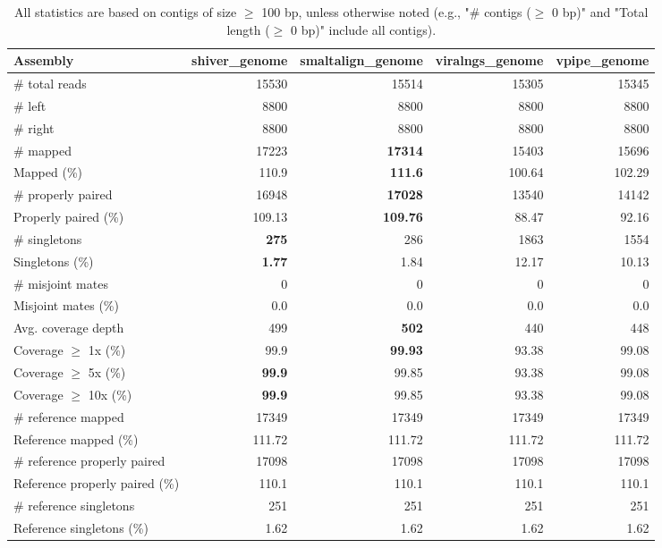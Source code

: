 \documentclass[12pt,a4paper]{article}
\begin{document}
\begin{table}[ht]
\begin{center}
\caption{All statistics are based on contigs of size $\geq$ 100 bp, unless otherwise noted (e.g., "\# contigs ($\geq$ 0 bp)" and "Total length ($\geq$ 0 bp)" include all contigs).}
\begin{tabular}{|l*{4}{|r}|}
\hline
Assembly & shiver\_genome & smaltalign\_genome & viralngs\_genome & vpipe\_genome \\ \hline
\# total reads & 15530 & 15514 & 15305 & 15345 \\ \hline
\# left & 8800 & 8800 & 8800 & 8800 \\ \hline
\# right & 8800 & 8800 & 8800 & 8800 \\ \hline
\# mapped & 17223 & {\bf 17314} & 15403 & 15696 \\ \hline
Mapped (\%) & 110.9 & {\bf 111.6} & 100.64 & 102.29 \\ \hline
\# properly paired & 16948 & {\bf 17028} & 13540 & 14142 \\ \hline
Properly paired (\%) & 109.13 & {\bf 109.76} & 88.47 & 92.16 \\ \hline
\# singletons & {\bf 275} & 286 & 1863 & 1554 \\ \hline
Singletons (\%) & {\bf 1.77} & 1.84 & 12.17 & 10.13 \\ \hline
\# misjoint mates & 0 & 0 & 0 & 0 \\ \hline
Misjoint mates (\%) & 0.0 & 0.0 & 0.0 & 0.0 \\ \hline
Avg. coverage depth & 499 & {\bf 502} & 440 & 448 \\ \hline
Coverage $\geq$ 1x (\%) & 99.9 & {\bf 99.93} & 93.38 & 99.08 \\ \hline
Coverage $\geq$ 5x (\%) & {\bf 99.9} & 99.85 & 93.38 & 99.08 \\ \hline
Coverage $\geq$ 10x (\%) & {\bf 99.9} & 99.85 & 93.38 & 99.08 \\ \hline
\# reference mapped & 17349 & 17349 & 17349 & 17349 \\ \hline
Reference mapped (\%) & 111.72 & 111.72 & 111.72 & 111.72 \\ \hline
\# reference properly paired & 17098 & 17098 & 17098 & 17098 \\ \hline
Reference properly paired (\%) & 110.1 & 110.1 & 110.1 & 110.1 \\ \hline
\# reference singletons & 251 & 251 & 251 & 251 \\ \hline
Reference singletons (\%) & 1.62 & 1.62 & 1.62 & 1.62 \\ \hline

\end{tabular}
\end{center}
\end{table}
\end{document}
